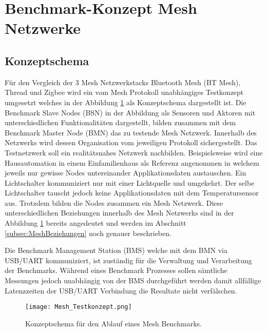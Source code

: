\clearpage
\section{Benchmark-Konzept Mesh Netzwerke}\label{sec:BenchmarkKonzeptMeshNetzwerke}

\subsection{Konzeptschema}\label{subsec:KonzeptschemaMesh}

Für den Vergleich der 3 Mesh Netzwerkstacks Bluetooth Mesh (BT Mesh), Thread und Zigbee wird ein vom Mesh Protokoll unabhängiges Testkonzept umgesetzt welches in der Abbildung \ref{fig:MeshTestKonzept} als Konzeptschema dargestellt ist. Die Benchmark Slave Nodes (BSN) in der Abbildung als Sensoren und Aktoren mit unterschiedlichen Funktionalitäten dargestellt, bilden zusammen mit dem Benchmark Master Node (BMN) das zu testende Mesh Netzwerk. Innerhalb des Netzwerks wird dessen Organisation vom jeweiligen Protokoll sichergestellt. Das Testnetzwerk soll ein realitätsnahes Netzwerk nachbilden. Beispielsweise wird eine Hausautomation in einem Einfamilienhaus als Referenz angenommen in welchem jeweils nur gewisse Nodes untereinander Applikationsdaten austauschen. Ein Lichtschalter kommuniziert nur mit einer Lichtquelle und umgekehrt. Der selbe Lichtschalter tauscht jedoch keine Applikationsdaten mit dem Temperatursensor aus. Trotzdem bilden die Nodes zusammen ein Mesh Netzwerk. Diese unterschiedlichen Beziehungen innerhalb des Mesh Netzwerks sind in der Abbildung \ref{fig:MeshTestKonzept} bereits angedeutet und werden im Abschnitt \ref{subsec:MeshBeziehungen} noch genauer beschrieben.

Die Benchmark Management Station (BMS) welche mit dem BMN via USB/UART kommuniziert, ist zuständig für die Verwaltung und Verarbeitung der Benchmarks. Während eines Benchmark Prozesses sollen sämtliche Messungen jedoch unabhängig von der BMS durchgeführt werden damit allfällige Latenzzeiten der USB/UART Verbindung die Resultate nicht verfälschen.



\begin{figure}[h]
	\centering
	\texttt{[image: Mesh\_Testkonzept.png]}
	\caption{Konzeptschema für den Ablauf eines Mesh Benchmarks.}\label{fig:MeshTestKonzept}
\end{figure}


